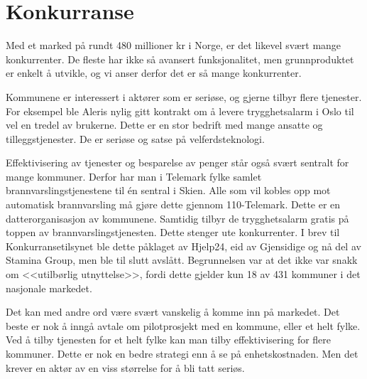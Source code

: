 


\section{Konkurranse}

Med et marked på rundt 480 millioner kr i Norge, er det likevel svært mange
konkurrenter. De fleste har ikke så avansert funksjonalitet, men grunnproduktet
er enkelt å utvikle, og vi anser derfor det er så mange konkurrenter.

Kommunene er interessert i aktører som er seriøse, og gjerne tilbyr flere
tjenester. For eksempel ble Aleris nylig gitt kontrakt om å levere
trygghetsalarm i Oslo \cite{telenor.aleris} til vel en tredel av brukerne.
Dette er en stor bedrift med mange ansatte og tilleggstjenester. De er seriøse
og satse på velferdsteknologi.

Effektivisering av tjenester og besparelse av penger står også svært sentralt
for mange kommuner. Derfor har man i Telemark fylke samlet
brannvarslingstjenestene til én sentral i Skien. Alle som vil kobles opp mot
automatisk brannvarsling må gjøre dette gjennom 110-Telemark. Dette er en
datterorganisasjon av kommunene. Samtidig tilbyr de trygghetsalarm gratis på
toppen av brannvarslingstjenesten. Dette stenger ute konkurrenter. I brev til
Konkurransetilsynet \cite{telemark.konkurransetilsyn} ble dette påklaget av
Hjelp24, eid av Gjensidige og nå del av Stamina Group, men ble til slutt
avslått. Begrunnelsen var at det ikke var snakk om <<utilbørlig utnyttelse>>,
fordi dette gjelder kun 18 av 431 kommuner i det nasjonale markedet.

Det kan med andre ord være svært vanskelig å komme inn på markedet. Det beste
er nok å inngå avtale om pilotprosjekt med en kommune, eller et helt fylke. Ved
å tilby tjenesten for et helt fylke kan man tilby effektivisering for flere
kommuner. Dette er nok en bedre strategi enn å se på enhetskostnaden. Men det
krever en aktør av en viss størrelse for å bli tatt seriøs.

